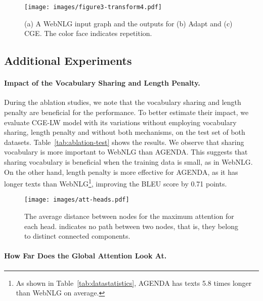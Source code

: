 \documentclass[11pt,a4paper]{article}
\begin{document}
 \begin{figure*}[t]
    \centering
    \texttt{[image: images/figure3-transform4.pdf]}
    \vspace{-8mm}
    \caption{(a) A WebNLG input graph and the outputs for (b) Adapt and (c) CGE. The color face indicates repetition.}
    \label{fig:examples}
\end{figure*}

\subsection{Additional Experiments}

\paragraph{Impact of the Vocabulary Sharing and Length Penalty.}

During the ablation studies, we note that the vocabulary sharing and length penalty are beneficial for the performance. To better estimate their impact, we evaluate {\selectfont CGE-LW} model with its variations without employing vocabulary sharing, length penalty and without both mechanisms, on the test set of both datasets. Table~\ref{tab:ablation-test} shows the results. We observe that sharing vocabulary is more important to WebNLG than AGENDA. This suggests that sharing vocabulary is beneficial when the training data is small, as in WebNLG. On the other hand, length penalty is more effective for AGENDA, as it has longer texts than WebNLG\footnote{As shown in Table~\ref{tab:datastatistics}, AGENDA has texts 5.8 times longer than WebNLG on average.}, improving the BLEU score by 0.71 points.

 \begin{figure}[t]
    \centering
    \texttt{[image: images/att-heads.pdf]}
    \vspace{-4mm}
    \caption{The average distance between nodes for the maximum attention for each head.  indicates no path between two nodes, that is, they belong to distinct connected components.}
    \label{fig:attns}
    \vspace{-4mm}
\end{figure}
\paragraph{How Far Does the Global Attention Look At.}
\end{document}
